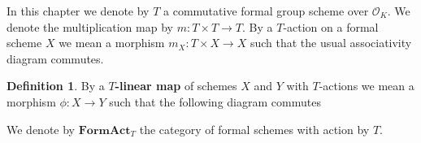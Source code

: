 \documentclass[10pt,oneside]{amsart}
\theoremstyle{definition}
\newtheorem{definition}[theorem]{Definition}
\begin{document}
	
	
	In this chapter we denote by $T$ a commutative formal group scheme over $\mathcal O_K$. We denote the multiplication map by $m:T\times T\rightarrow T$. By a $T$-action on a formal scheme $X$ we mean a morphism $m_X:T\times X\rightarrow X$ such that the usual associativity diagram commutes. 
	\begin{definition}
		By a \textbf{$T$-linear map} of schemes $X$ and $Y$ with $T$-actions we mean a morphism $\phi:X\rightarrow Y$ such that the following diagram commutes
		\begin{center}
		\end{center}
		We denote by $\mathbf{FormAct}_T$ the category of formal schemes with action by $T$.
	\end{definition}
	
\end{document}
